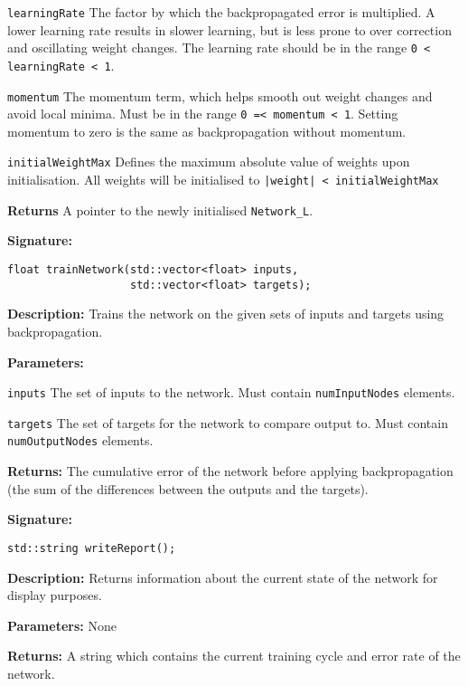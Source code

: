 \documentclass[a4paper]{article}
\begin{document}
\lstinline{learningRate} The factor by which the backpropagated error is multiplied. A lower learning rate results in slower learning, but is less prone to over correction and oscillating weight changes. The learning rate should be in the range \lstinline{0 < learningRate < 1}.

\lstinline{momentum} The momentum term, which helps smooth out weight changes and avoid local minima. Must be in the range \lstinline{0 =< momentum < 1}. Setting momentum to zero is the same as backpropagation without momentum.

\lstinline{initialWeightMax} Defines the maximum absolute value of weights upon initialisation. All weights will be initialised to \lstinline{|weight| < initialWeightMax} 

\textbf{Returns}
A pointer to the newly initialised \lstinline{Network_L}.

\hrulefill %

\textbf{Signature:} \begin{lstlisting}
float trainNetwork(std::vector<float> inputs,
                   std::vector<float> targets);
\end{lstlisting}

\textbf{Description: }
Trains the network on the given sets of inputs and targets using backpropagation.

\textbf{Parameters: }

\lstinline{inputs} The set of inputs to the network. Must contain \lstinline{numInputNodes} elements.

\lstinline{targets} The set of targets for the network to compare output to. Must contain \lstinline{numOutputNodes} elements.

\textbf{Returns: }
The cumulative error of the network before applying backpropagation (the sum of the differences between the outputs and the targets).

\hrulefill %

\textbf{Signature:} \begin{lstlisting}
std::string writeReport();
\end{lstlisting}

\textbf{Description: }
Returns information about the current state of the network for display purposes.

\textbf{Parameters: } None

\textbf{Returns: }
A string which contains the current training cycle and error rate of the network.
\end{document}
